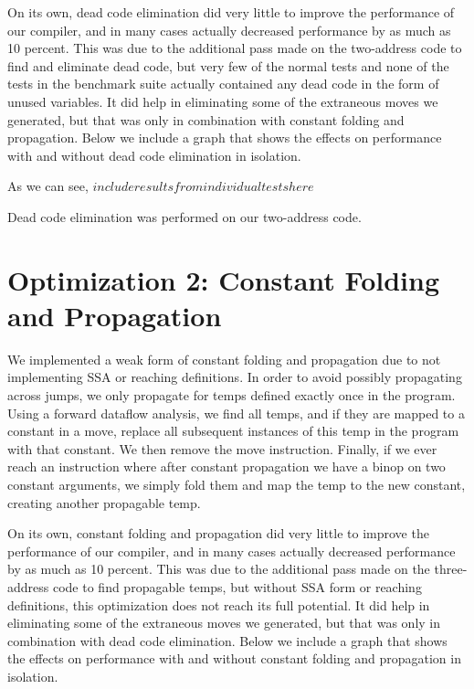 \documentclass{article}
\begin{document}
On its own, dead code elimination did very little to improve the performance of our compiler, and in many cases actually decreased performance by as much as 10 percent. This was due to the additional pass made on the two-address code to find and eliminate dead code, but very few of the normal tests and none of the tests in the benchmark suite actually contained any dead code in the form of unused variables. It did help in eliminating some of the extraneous moves we generated, but that was only in combination with constant folding and propagation. Below we include a graph that shows the effects on performance with and without dead code elimination in isolation.






As we can see, $include results from individual tests here$

Dead code elimination was performed on our two-address code.


\section{Optimization 2: Constant Folding and Propagation}

We implemented a weak form of constant folding and propagation due to not implementing SSA or reaching definitions. In order to avoid possibly propagating across jumps, we only propagate for temps defined exactly once in the program. Using a forward dataflow analysis, we find all temps, and if they are mapped to a constant in a move, replace all subsequent instances of this temp in the program with that constant. We then remove the move instruction. Finally, if we ever reach an instruction where after constant propagation we have a binop on two constant arguments, we simply fold them and map the temp to the new constant, creating another propagable temp.

On its own, constant folding and propagation did very little to improve the performance of our compiler, and in many cases actually decreased performance by as much as 10 percent. This was due to the additional pass made on the three-address code to find propagable temps, but without SSA form or reaching definitions, this optimization does not reach its full potential. It did help in eliminating some of the extraneous moves we generated, but that was only in combination with dead code elimination. Below we include a graph that shows the effects on performance with and without constant folding and propagation in isolation.
\end{document}
